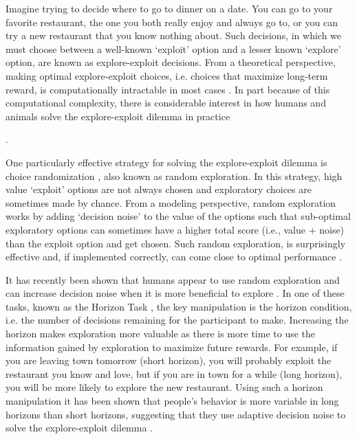 \documentclass[12pt]{article}
\begin{document}
	Imagine trying to decide where to go to dinner on a date. You can go to your favorite restaurant, the one you both really enjoy and always go to, or you can try a new restaurant that you know nothing about. Such decisions, in which we must choose between a well-known `exploit' option and a lesser known `explore' option, are known as explore-exploit decisions.  From a theoretical perspective, making optimal explore-exploit choices, i.e. choices that maximize long-term reward, is computationally intractable in most cases \citep{eegittins74, eeBasu18}. In part because of this computational complexity, there is considerable interest in how humans and animals solve the explore-exploit dilemma in practice {\citep{Mehlhorn15, SCHULZ20197,WILSON202149}.
	
	One particularly effective strategy for solving the explore-exploit dilemma is choice randomization \citep{eethompson33, eewatkins89, eebridle90}, also known as random exploration. In this strategy, high value `exploit' options are not always chosen and exploratory choices are sometimes made by chance. From a modeling perspective, random exploration works by adding `decision noise' to the value of the options such that sub-optimal exploratory options can sometimes have a higher total score (i.e., value + noise) than the exploit option and get chosen. Such random exploration, is surprisingly effective and, if implemented correctly, can come close to optimal performance \citep{eethompson33, eebridle90, eeAgrawal11, eeChapelle11}.
	
	It has recently been shown that humans appear to use random exploration and can increase  decision noise when it is more beneficial to explore \citep{Gershman2018, wilson2014, Findling19}. In one of these tasks, known as the Horizon Task \citep{wilson2014}, the key manipulation is the horizon condition, i.e. the number of decisions remaining for the participant to make. Increasing the horizon makes exploration more valuable as there is more time to use the information gained by exploration to maximize future rewards. For example, if you are leaving town tomorrow (short horizon), you will probably exploit the restaurant you know and love, but if you are in town for a while (long horizon), you will be more likely to explore the new restaurant. Using such a horizon manipulation it has been shown that people's behavior is more variable in long horizons than short horizons, suggesting that they use adaptive decision noise to solve the explore-exploit dilemma \citep{wilson2014}. 

}
\end{document}
